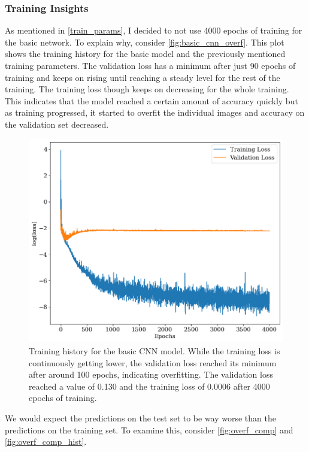 \subsubsection*{Training Insights}


As mentioned in \cref{train_params}, I decided to not use 4000 epochs of training for the basic network. To explain why, consider \autoref{fig:basic_cnn_overf}. This plot shows the training history for the basic model and the previously mentioned training parameters. The validation loss has a minimum after just 90 epochs of training and keeps on rising until reaching a steady level for the rest of the training. The training loss though keeps on decreasing for the whole training. This indicates that the model reached a certain amount of accuracy quickly but as training progressed, it started to overfit the individual images and accuracy on the validation set decreased. 

\begin{figure}[H]
\centering
\includegraphics[width=.667\textwidth]{images/Chapter4/Basic CNN/hist_overf.png}
\caption{Training history for the basic CNN model. While the training loss is continuously getting lower, the validation loss reached its minimum after around 100 epochs, indicating overfitting. The validation loss reached a value of 0.130 and the training loss of 0.0006 after 4000 epochs of training.} 
\label{fig:basic_cnn_overf}
\end{figure}

We would expect the predictions on the test set to be way worse than the predictions on the training set. To examine this, consider \autoref{fig:overf_comp} and \ref{fig:overf_comp_hist}.

